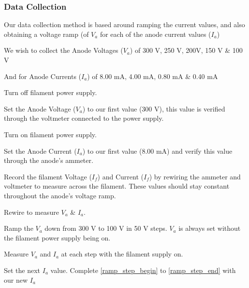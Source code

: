 \subsubsection{Data Collection}

Our data collection method is based around ramping the current values, and also obtaining a voltage ramp (of $V_a$ for each of the anode current values ($I_a$)
\par 

We wish to collect the Anode Voltages ($V_a$) of 300 V, 250 V, 200V, 150 V \& 100 V
\par
And for Anode Currents ($I_a$) of 8.00 mA,  4.00 mA, 0.80 mA \& 0.40 mA

\par
\begin{steps}
    \item Turn off filament power supply.
    \label{ramp_step_begin}
    
    \item Set the Anode Voltage ($V_a$) to our first value (300 V), this value is verified through the voltmeter connected to the power supply.
    
    \item Turn on filament power supply. 
    
    \item Set the Anode Current ($I_a$) to our first value (8.00 mA) and verify this value through the anode's ammeter.
    
    \item Record the filament Voltage ($I_f$) and Current ($I_f$) by rewiring the ammeter and voltmeter to measure across the filament. These values should stay constant throughout the anode's voltage ramp.
    
    \item Rewire to measure $V_a$ \& $I_a$. 
    
    \item Ramp the $V_a$ down from 300 V to 100 V in 50 V steps. $V_a$ is always set without the filament power supply being on. 
    
    \item Measure $V_a$ and $I_a$ at each step with the filament supply on.
    \label{ramp_step_end}
    
    \item Set the next $I_a$ value. Complete \ref{ramp_step_begin} to \ref{ramp_step_end} with our new $I_a$
    

\end{steps}
